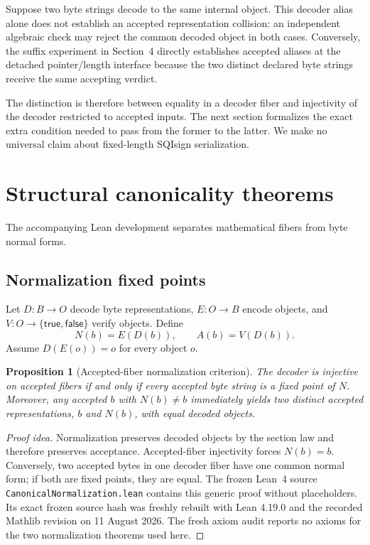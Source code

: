 \documentclass[11pt]{article}
\newtheorem{proposition}{Proposition}
\newcommand{\code}[1]{\texttt{#1}}
\begin{document}
Suppose two byte strings decode to the same internal object.  This decoder
alias alone does not establish an accepted representation collision: an
independent algebraic check may reject the common decoded object in both
cases.  Conversely, the suffix experiment in Section~4 directly establishes
accepted aliases at the detached pointer/length interface because the two
distinct declared byte strings receive the same accepting verdict.

The distinction is therefore between equality in a decoder fiber and
injectivity of the decoder restricted to accepted inputs.  The next section
formalizes the exact extra condition needed to pass from the former to the
latter.  We make no universal claim about fixed-length SQIsign serialization.

\section{Structural canonicality theorems}

The accompanying Lean development separates mathematical fibers from byte
normal forms.

\subsection{Normalization fixed points}

Let $D:B\to O$ decode byte representations, $E:O\to B$ encode objects, and
$V:O\to\{\mathsf{true},\mathsf{false}\}$ verify objects.  Define
\[
  N(b)=E(D(b)), \qquad A(b)=V(D(b)).
\]
Assume $D(E(o))=o$ for every object $o$.

\begin{proposition}[Accepted-fiber normalization criterion]
The decoder is injective on accepted fibers if and only if every accepted byte
string is a fixed point of $N$.  Moreover, any accepted $b$ with $N(b)\ne b$
immediately yields two distinct accepted representations, $b$ and $N(b)$,
with equal decoded objects.
\end{proposition}

\begin{proof}[Proof idea]
Normalization preserves decoded objects by the section law and therefore
preserves acceptance.  Accepted-fiber injectivity forces $N(b)=b$.
Conversely, two accepted bytes in one decoder fiber have one common normal
form; if both are fixed points, they are equal.  The frozen Lean~4
source~\cite{lean4-paper}
\code{CanonicalNormalization.lean} contains this generic proof without
placeholders.  Its exact frozen source hash was freshly rebuilt with Lean
4.19.0 and the recorded Mathlib revision on 11 August 2026.  The fresh axiom
audit reports no axioms for the two normalization theorems used here.
\end{proof}
\end{document}
